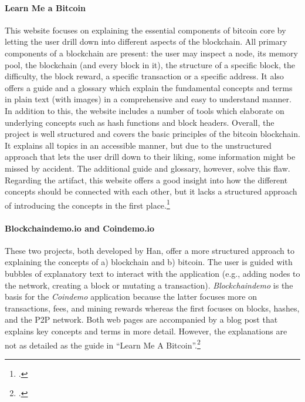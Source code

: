 \paragraph{Learn Me a Bitcoin} This website focuses on explaining the essential components of bitcoin core by letting the user drill down into different aspects of the blockchain. All primary components of a blockchain are present: the user may inspect a node, its memory pool, the blockchain (and every block in it), the structure of a specific block, the difficulty, the block reward, a specific transaction or a specific address. It also offers a guide and a glossary which explain the fundamental concepts and terms in plain text (with images) in a comprehensive and easy to understand manner. In addition to this, the website includes a number of tools which elaborate on underlying concepts such as hash functions and block headers. Overall, the project is well structured and covers the basic principles of the bitcoin blockchain. It explains all topics in an accessible manner, but due to the unstructured approach that lets the user drill down to their liking, some information might be missed by accident. The additional guide and glossary, however, solve this flaw. Regarding the artifact, this website offers a good insight into how the different concepts should be connected with each other, but it lacks a structured approach of introducing the concepts in the first place.\footcite[Cf.][]{WalkerLearnmeBitcoin2016}

\paragraph{Blockchaindemo.io and Coindemo.io} These two projects, both developed by Han, offer a more structured approach to explaining the concepts of a) blockchain and b) bitcoin. The user is guided with bubbles of explanatory text to interact with the application (e.g., adding nodes to the network, creating a block or mutating a transaction). \textit{Blockchaindemo} is the basis for the \textit{Coindemo} application because the latter focuses more on transactions, fees, and mining rewards whereas the first focuses on blocks, hashes, and the P2P network. Both web pages are accompanied by a blog post that explains key concepts and terms in more detail. However, the explanations are not as detailed as the guide in \enquote{Learn Me A Bitcoin}.\footcites[Cf.][]{HanHowdoesblockchain2017}[cf.][]{HanBlockchainDemo2017}[cf.][]{HanHowdoesbitcoin2017}[cf.][]{HanCoinDemo2017}

